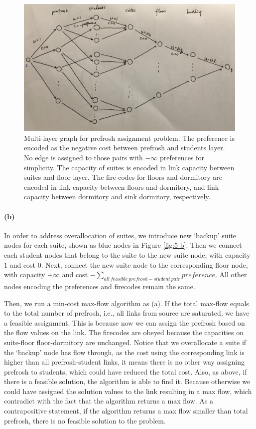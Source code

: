 \documentclass[12pt]{article}
\begin{document}
\begin{figure}[h!]
	\centering
	\includegraphics[width=1\textwidth]{5-a.jpg}
	\caption{Multi-layer graph for prefrosh assignment problem. The preference is encoded as the negative cost between prefrosh and students layer. No edge is assigned to those pairs with $-\infty$ preferences for simplicity. The capacity of suites is encoded in link capacity between suites and floor layer. The fire-codes for floors and dormitory are encoded in link capacity between floors and dormitory, and link capacity between dormitory and sink dormitory, respectively.}
	\label{fig:5-a}
\end{figure}
\paragraph{(b)} In order to address overallocation of suites, we introduce new `backup' suite nodes for each suite, shown as blue nodes in Figure \ref{fig:5-b}. Then we connect each student nodes that belong to the suite to the new suite node, with capacity $1$ and cost $0$. Next, connect the new suite node to the corresponding floor node, with capacity $+\infty$ and cost $-\sum_{all\:feasible\:prefrosh-student\:pair} preference$. All other nodes encoding the preferences and firecodes remain the same. 

Then, we run a min-cost max-flow algorithm as (a). If the total max-flow equals to the total number of prefrosh, i.e., all links from source are saturated, we have a feasible assignment. This is because now we can assign the prefrosh based on the flow values on the link. The firecodes are obeyed because the capacities on suite-floor floor-dormitory are unchanged. Notice that we overallocate a suite if the `backup' node has flow through, as the cost using the corresponding link is higher than all prefrosh-student links, it means there is no other way assigning prefrosh to students, which could have reduced the total cost. Also, as above, if there is a feasible solution, the algorithm is able to find it. Because otherwise we could have assigned the solution values to the link resulting in a max flow, which contradict with the fact that the algorithm returns a max flow. As a contrapositive statement, if the algorithm returns a max flow smaller than total prefrosh, there is no feasible solution to the problem.
\end{document}
